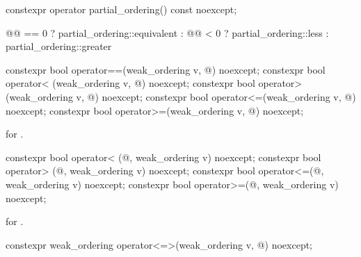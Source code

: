 %
\begin{itemdecl}
constexpr operator partial_ordering() const noexcept;
\end{itemdecl}

\begin{itemdescr}
\pnum
\returns
\begin{codeblock}
@@ == 0 ? partial_ordering::equivalent :
@@ < 0  ? partial_ordering::less :
             partial_ordering::greater
\end{codeblock}
\end{itemdescr}

%
%
%
%
%
\begin{itemdecl}
constexpr bool operator==(weak_ordering v, @\unspec@) noexcept;
constexpr bool operator< (weak_ordering v, @\unspec@) noexcept;
constexpr bool operator> (weak_ordering v, @\unspec@) noexcept;
constexpr bool operator<=(weak_ordering v, @\unspec@) noexcept;
constexpr bool operator>=(weak_ordering v, @\unspec@) noexcept;
\end{itemdecl}

\begin{itemdescr}
\pnum
\returns
{} for .
\end{itemdescr}

%
%
%
%
\begin{itemdecl}
constexpr bool operator< (@\unspec@, weak_ordering v) noexcept;
constexpr bool operator> (@\unspec@, weak_ordering v) noexcept;
constexpr bool operator<=(@\unspec@, weak_ordering v) noexcept;
constexpr bool operator>=(@\unspec@, weak_ordering v) noexcept;
\end{itemdecl}

\begin{itemdescr}
\pnum
\returns
{} for .
\end{itemdescr}

%
\begin{itemdecl}
constexpr weak_ordering operator<=>(weak_ordering v, @\unspec@) noexcept;
\end{itemdecl}

